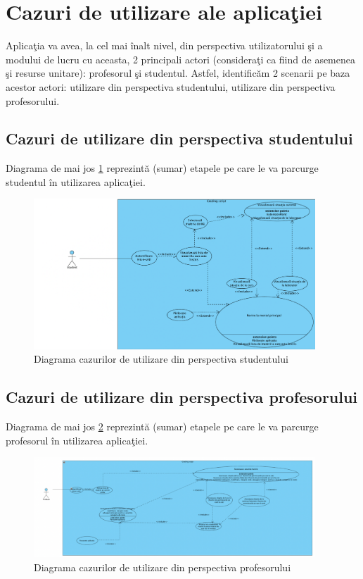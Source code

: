 \documentclass{report}
\begin{document}
\section{Cazuri de utilizare ale aplica\c tiei}
Aplica\c tia va avea, la cel mai înalt nivel, din perspectiva utilizatorului \c si a modului de lucru cu aceasta, 2 principali actori (considera\c ti ca fiind de asemenea \c si resurse unitare): profesorul \c si studentul.
Astfel, identificăm 2 scenarii pe baza acestor actori: utilizare din perspectiva studentului, utilizare din perspectiva profesorului.
\subsection{Cazuri de utilizare din perspectiva studentului}
Diagrama de mai jos \ref{dgram1} reprezintă (sumar) etapele pe care le va parcurge studentul în utilizarea aplica\c tiei.

\begin{figure}[h!]
    \centering
    \includegraphics[width=300pt]{img/dgram1.png}
    \caption{Diagrama cazurilor de utilizare din perspectiva studentului}
    \label{dgram1}
\end{figure}

\subsection{Cazuri de utilizare din perspectiva profesorului}

Diagrama de mai jos \ref{dgram2} reprezintă (sumar) etapele pe care le va parcurge profesorul în utilizarea aplica\c tiei.

\begin{figure}[h!]
    \centering
    \includegraphics[width=300pt]{img/dgram2.png}
    \caption{Diagrama cazurilor de utilizare din perspectiva profesorului}
    \label{dgram2}
\end{figure}
\end{document}
